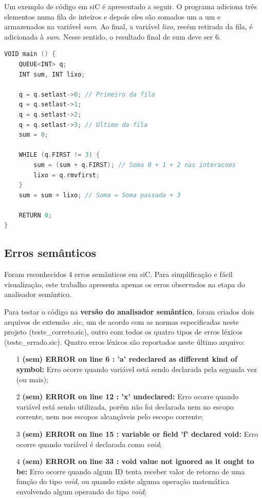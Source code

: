 \documentclass[12pt]{article}
\begin{document}
\indent Um exemplo de código em siC é apresentado a seguir. O programa adiciona três elementos numa fila de inteiros e depois eles são somados um a um e armazenados na variável \textit{sum}. Ao final, a variável \textit{lixo}, recém retirada da fila, é adicionada à \textit{sum}. Nesse sentido, o resultado final de sum deve ser 6. \\
\begin{lstlisting}[language=C]
VOID main () {
    QUEUE<INT> q;
    INT sum, INT lixo;

    q = q.setlast->0; // Primeiro da fila
    q = q.setlast->1;
    q = q.setlast->2;
    q = q.setlast->3; // Ultimo da fila
    sum = 0;
    
    WHILE (q.FIRST != 3) {    
        sum = (sum + q.FIRST); // Soma 0 + 1 + 2 nas interacoes
        lixo = q.rmvfirst;
    }
    sum = sum + lixo; // Soma = Soma passada + 3

    RETURN 0;
}

\end{lstlisting}

\subsection{Erros semânticos} \label{errossem}

\indent Foram reconhecidos 4 erros semânticos em siC. Para simplificação e fácil visualização, este trabalho apresenta apenas os erros observados na etapa do analisador semântico.

\indent Para testar o código na \textbf{versão do analisador semântico}, foram criados dois arquivos de extensão .sic, um de acordo com as normas especificadas neste projeto (teste\_correto.sic), outro com todos os quatro tipos de erros léxicos (teste\_errado.sic). Quatro erros léxicos são reportados neste último arquivo:
\begin{itemize}
\item[1] \textbf{(sem) ERROR on line 6 : 'a' redeclared as different kind of symbol:} Erro ocorre quando variável está sendo declarada pela segunda vez (ou mais);
\item[2] \textbf{(sem) ERROR on line 12 : 'x' undeclared:} Erro ocorre quando variável está sendo utilizada, porém não foi declarada nem no escopo corrente, nem nos escopos alcançáveis pelo escopo corrente;
\item[3] \textbf{(sem) ERROR on line 15 : variable or field 'f' declared void:} Erro ocorre quando variável é declarada como \textit{void};
\item[4] \textbf{(sem) ERROR on line 33 : void value not ignored as it ought to be:} Erro ocorre quando algum ID tenta receber valor de retorno de uma função do tipo \textit{void}, ou quando existe alguma operação matemática envolvendo algum operando do tipo \textit{void};
\end{itemize}
\end{document}
